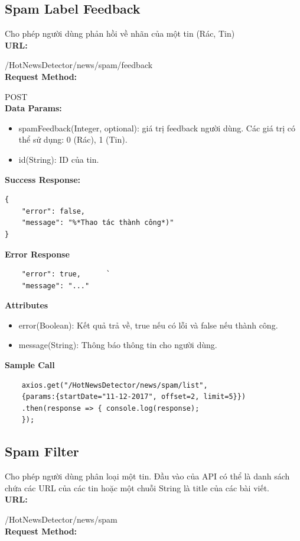 \subsection{Spam Label Feedback}
Cho phép người dùng phản hồi về nhãn của một tin (Rác, Tin) \\
\textbf{URL:} 

    /HotNewsDetector/news/spam/feedback \\
\textbf{Request Method:}

POST\\
\textbf{Data Params:}
\begin{itemize}
	\item spamFeedback(Integer, optional): giá trị feedback người dùng. Các giá trị có thể sử dụng: 0 (Rác), 1 (Tin).
	\item id(String): ID của tin.
\end{itemize}
\textbf{Success Response:} 
\begin{lstlisting}
{
	"error": false,
	"message": "%*Thao tác thành công*)"
}
\end{lstlisting}
\textbf{Error Response}
\begin{lstlisting}
	"error": true,		`
	"message": "..."
\end{lstlisting}
\textbf{Attributes}
\begin{itemize}
	\item error(Boolean): Kết quả trả về, true nếu có lỗi và false nếu thành công. 
	\item message(String): Thông báo thông tin cho người dùng.
\end{itemize}
\textbf{Sample Call}
\begin{lstlisting}
	axios.get("/HotNewsDetector/news/spam/list",
	{params:{startDate="11-12-2017", offset=2, limit=5}})
	.then(response => { console.log(response);
	});
\end{lstlisting}
\subsection{Spam Filter}
Cho phép người dùng phân loại một tin. Đầu vào của API có thể là danh sách chứa các URL của các tin hoặc một chuỗi String là title của các bài viết. \\
\textbf{URL:}

/HotNewsDetector/news/spam\\
\textbf{Request Method:}

